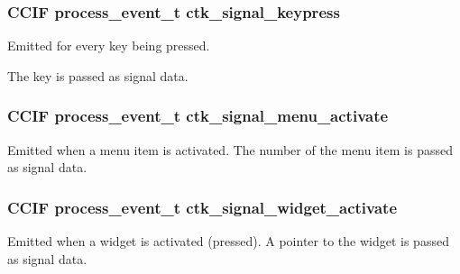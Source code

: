 \subsubsection[{ctk\+\_\+signal\+\_\+keypress}]{\setlength{\rightskip}{0pt plus 5cm}C\+C\+I\+F process\+\_\+event\+\_\+t ctk\+\_\+signal\+\_\+keypress}\label{group__ctkappfunc_ga402ef668c2e4a1ba24e7dff9d8b8d82c}
Emitted for every key being pressed.

The key is passed as signal data. \hypertarget{group__ctkappfunc_gab42f0dd069d79854b05a7da8390b8e6f}{}
\subsubsection[{ctk\+\_\+signal\+\_\+menu\+\_\+activate}]{\setlength{\rightskip}{0pt plus 5cm}C\+C\+I\+F process\+\_\+event\+\_\+t ctk\+\_\+signal\+\_\+menu\+\_\+activate}\label{group__ctkappfunc_gab42f0dd069d79854b05a7da8390b8e6f}
Emitted when a menu item is activated. The number of the menu item is passed as signal data. \hypertarget{group__ctkappfunc_ga277f650dd55185e3f451a6dbe91701aa}{}
\subsubsection[{ctk\+\_\+signal\+\_\+widget\+\_\+activate}]{\setlength{\rightskip}{0pt plus 5cm}C\+C\+I\+F process\+\_\+event\+\_\+t ctk\+\_\+signal\+\_\+widget\+\_\+activate}\label{group__ctkappfunc_ga277f650dd55185e3f451a6dbe91701aa}
Emitted when a widget is activated (pressed). A pointer to the widget is passed as signal data. \hypertarget{group__ctkappfunc_ga6d9f0f4b1f9361038433a4201fa1959e}{}
